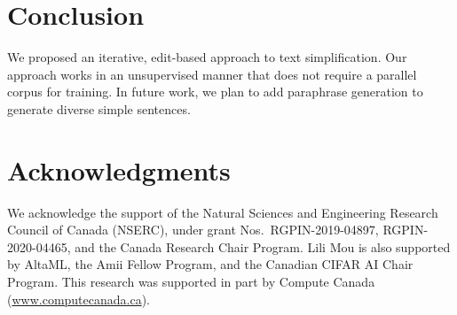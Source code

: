 \documentclass[11pt,a4paper]{article}
\begin{document}
\section{Conclusion}

We proposed an iterative, edit-based approach to text simplification. Our approach works in an unsupervised manner that  does not require a parallel corpus for training. In future work, we plan to add paraphrase generation to generate diverse simple sentences.

\section*{Acknowledgments}

We acknowledge the support of the Natural Sciences and Engineering Research Council of Canada (NSERC), under grant Nos.~RGPIN-2019-04897, RGPIN-2020-04465, and the Canada Research Chair Program. 
Lili Mou is also supported by AltaML, the Amii
Fellow Program, and the Canadian CIFAR AI Chair Program. This research was supported in part by Compute Canada (\url{www.computecanada.ca}).




\end{document}
